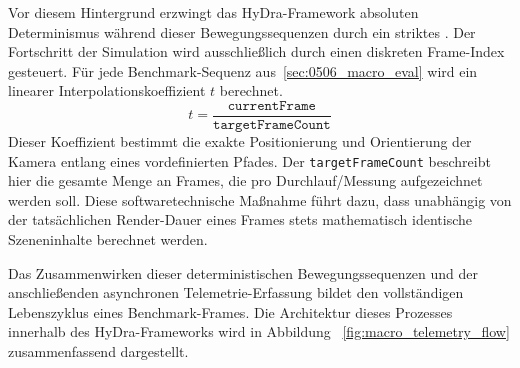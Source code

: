 Vor diesem Hintergrund erzwingt das \ac{HyDra}-Framework absoluten Determinismus während dieser Bewegungssequenzen
durch ein striktes .
Der Fortschritt der Simulation wird ausschließlich durch einen diskreten Frame-Index gesteuert.
Für jede Benchmark-Sequenz aus~\ref{sec:0506_macro_eval} wird ein linearer Interpolationskoeffizient $t$ berechnet.
\begin{equation}
    t = \frac{\texttt{currentFrame}}{\texttt{targetFrameCount}}
    \label{eq:frame_time_ratio}
\end{equation}
Dieser Koeffizient bestimmt die exakte Positionierung und Orientierung der Kamera entlang eines vordefinierten Pfades.
Der \texttt{targetFrameCount} beschreibt hier die gesamte Menge an Frames, die pro Durchlauf/Messung aufgezeichnet
werden soll.
Diese softwaretechnische Maßnahme führt dazu, dass unabhängig von der tatsächlichen Render-Dauer eines Frames stets
mathematisch identische Szeneninhalte berechnet werden.

Das Zusammenwirken dieser deterministischen Bewegungssequenzen und der anschließenden asynchronen Telemetrie-Erfassung
bildet den vollständigen Lebenszyklus eines Benchmark-Frames.
Die Architektur dieses Prozesses innerhalb des \ac{HyDra}-Frameworks wird in Abbildung ~\ref{fig:macro_telemetry_flow}
zusammenfassend dargestellt.

